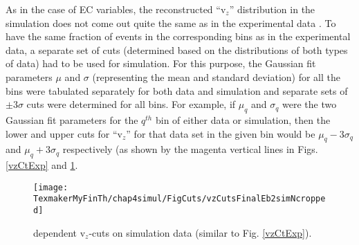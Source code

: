 As in the case of EC variables, the reconstructed ``v$_z$'' distribution in the simulation does not come out quite the same as in the experimental data %
. To have the same fraction of events in the corresponding \qsqs bins as in the experimental data, a separate set of cuts (determined based on the distributions of both types of data) had to be used for simulation. For this purpose, the Gaussian fit parameters $\mu$ and $\sigma$ (representing the mean and standard deviation) for all the \qsqs bins were tabulated separately for both data and simulation and separate sets of $\pm 3\sigma$ cuts were determined for all bins. For example, if $\mu_q$ and $\sigma_q$ were the two Gaussian fit parameters for the $q^{th}$ \qsqs bin of either data or simulation, then the lower and upper cuts for ``v$_z$'' for that data set in the given \qsqs bin would be $\mu_q - 3\sigma_q$ and $\mu_q + 3\sigma_q$ respectively (as shown by the magenta vertical lines in Figs. \ref{vzCtExp} and \ref{vzCtSim}.




\begin{figure}[H]%
\leavevmode \texttt{[image: TexmakerMyFinTh/chap4simul/FigCuts/vzCutsFinalEb2simNcropped]}  %
\caption[v$_z$ cuts (Sim.)]{\qsqs dependent v$_z$-cuts on simulation data (similar to Fig. \ref{vzCtExp}).}
\label{vzCtSim}
\end{figure}



